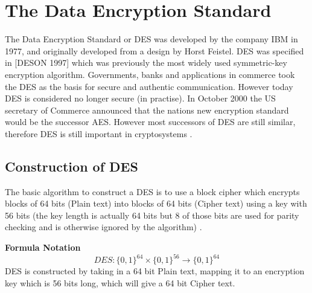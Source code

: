 \documentclass[11pt,a4paper]{report}
\begin{document}
\chapter{The Data Encryption Standard}
\label{cha:DES}

The Data Encryption Standard  or DES was developed by the company IBM in 1977, and originally developed from a design by Horst Feistel. DES was specified in [DESON 1997] which was previously the most widely used symmetric-key encryption algorithm. Governments, banks and applications in commerce took the DES as the basis for secure and authentic communication. However today DES is considered no longer secure (in practise). In October 2000 the US secretary of Commerce announced that the nations new encryption standard would be the successor AES. However most successors of DES are still similar, therefore DES is still important in cryptosystems \cite{DBLP:series/isc/DelfsK07} \cite{DBLP:books/sp/Buchmann02}. 

\section{Construction of DES}
\label{sec:conDES}
The basic algorithm to construct a DES is to use a block cipher which encrypts blocks of 64 bits (Plain text) into blocks of 64 bits (Cipher text) using a key with 56 bits (the key length is actually 64 bits but 8 of those bits are used for parity checking and is otherwise ignored by the algorithm) \cite{Fabio2000LogicalSAT}.\newline



\textbf{Formula Notation}
\begin{displaymath}
DES: \{0,1\}^{64} \times \{0,1\}^{56} \rightarrow \{0,1\}^{64}
\end{displaymath}
DES is constructed by taking in a 64 bit Plain text, mapping it to an encryption key which is 56 bits long, which will give a 64 bit Cipher text.\newline
\end{document}
